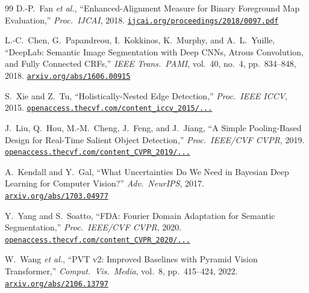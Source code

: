 \documentclass[12pt,a4paper]{report}
\begin{document}
\begin{thebibliography}{99}
D.-P.~Fan \textit{et al.},
``Enhanced-Alignment Measure for Binary Foreground Map Evaluation,''
\textit{Proc.\ IJCAI}, 2018.
\newline \href{https://www.ijcai.org/proceedings/2018/0097.pdf}{\texttt{ijcai.org/proceedings/2018/0097.pdf}}

L.-C.~Chen, G.~Papandreou, I.~Kokkinos, K.~Murphy, and A.~L.~Yuille,
``DeepLab: Semantic Image Segmentation with Deep CNNs, Atrous Convolution, and Fully Connected CRFs,''
\textit{IEEE Trans.\ PAMI}, vol.~40, no.~4, pp.~834--848, 2018.
\newline \href{https://arxiv.org/abs/1606.00915}{\texttt{arxiv.org/abs/1606.00915}}

S.~Xie and Z.~Tu,
``Holistically-Nested Edge Detection,''
\textit{Proc.\ IEEE ICCV}, 2015.
\newline \href{https://openaccess.thecvf.com/content_iccv_2015/papers/Xie_Holistically-Nested_Edge_Detection_ICCV_2015_paper.pdf}{\texttt{openaccess.thecvf.com/content\_iccv\_2015/...}}

J.~Liu, Q.~Hou, M.-M.~Cheng, J.~Feng, and J.~Jiang,
``A Simple Pooling-Based Design for Real-Time Salient Object Detection,''
\textit{Proc.\ IEEE/CVF CVPR}, 2019.
\newline \href{https://openaccess.thecvf.com/content_CVPR_2019/papers/Liu_A_Simple_Pooling-Based_Design_for_Real-Time_Salient_Object_Detection_CVPR_2019_paper.pdf}{\texttt{openaccess.thecvf.com/content\_CVPR\_2019/...}}

A.~Kendall and Y.~Gal,
``What Uncertainties Do We Need in Bayesian Deep Learning for Computer Vision?''
\textit{Adv.\ NeurIPS}, 2017.
\newline \href{https://arxiv.org/abs/1703.04977}{\texttt{arxiv.org/abs/1703.04977}}

Y.~Yang and S.~Soatto,
``FDA: Fourier Domain Adaptation for Semantic Segmentation,''
\textit{Proc.\ IEEE/CVF CVPR}, 2020.
\newline \href{https://openaccess.thecvf.com/content_CVPR_2020/papers/Yang_FDA_Fourier_Domain_Adaptation_for_Semantic_Segmentation_CVPR_2020_paper.pdf}{\texttt{openaccess.thecvf.com/content\_CVPR\_2020/...}}

W.~Wang \textit{et al.},
``PVT v2: Improved Baselines with Pyramid Vision Transformer,''
\textit{Comput.\ Vis.\ Media}, vol.~8, pp.~415--424, 2022.
\newline \href{https://arxiv.org/abs/2106.13797}{\texttt{arxiv.org/abs/2106.13797}}

\end{thebibliography}
\end{document}
